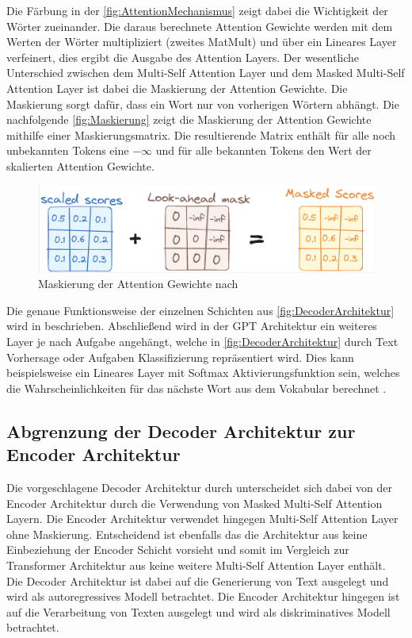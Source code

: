 \documentclass[conference]{IEEEtran}
\begin{document}
Die Färbung in der \autoref{fig:AttentionMechanismus} zeigt dabei die Wichtigkeit der Wörter zueinander. Die daraus berechnete Attention Gewichte werden mit dem Werten der Wörter multipliziert (zweites MatMult) und über ein Lineares Layer verfeinert, dies ergibt die Ausgabe des Attention Layers. 
Der wesentliche Unterschied zwischen dem Multi-Self Attention Layer und dem Masked Multi-Self Attention Layer ist dabei die Maskierung der Attention Gewichte. Die Maskierung sorgt dafür, dass ein Wort nur von vorherigen Wörtern abhängt. Die nachfolgende \autoref{fig:Maskierung} zeigt die Maskierung der Attention Gewichte mithilfe einer Maskierungsmatrix. Die resultierende Matrix enthält für alle noch unbekannten Tokens eine $-\infty$ und für alle bekannten Tokens den Wert der skalierten Attention Gewichte.

\begin{figure}[htbp]
    \centerline{\includegraphics[width=\linewidth]{Bilder/MaskierungAttentionWeights.png}}
    \caption{Maskierung der Attention Gewichte nach \cite{WieTransformatorenFunktionieren}}
\label{fig:Maskierung}
\end{figure}
Die genaue Funktionsweise der einzelnen Schichten aus \autoref{fig:DecoderArchitektur}  wird in \cite{vaswaniAttentionAllYou2023} beschrieben. Abschließend wird in der GPT Architektur ein weiteres Layer je nach Aufgabe angehängt, welche in \autoref{fig:DecoderArchitektur} durch Text Vorhersage oder Aufgaben Klassifizierung repräsentiert wird. Dies kann beispielsweise ein Lineares Layer mit Softmax Aktivierungsfunktion sein, welches die Wahrscheinlichkeiten für das nächste Wort aus dem Vokabular berechnet \cite{WieTransformatorenFunktionieren}.
\subsection{Abgrenzung der Decoder Architektur zur Encoder Architektur}
Die vorgeschlagene Decoder Architektur durch \cite{radfordImprovingLanguageUnderstanding} unterscheidet sich dabei von der Encoder Architektur durch die Verwendung von Masked Multi-Self Attention Layern. Die Encoder Architektur verwendet hingegen Multi-Self Attention Layer ohne Maskierung. Entscheidend ist ebenfalls das die Architektur aus \cite{radfordImprovingLanguageUnderstanding} keine Einbeziehung der Encoder Schicht vorsieht und somit im Vergleich zur Transformer Architektur aus \cite{vaswaniAttentionAllYou2023} keine weitere Multi-Self Attention Layer enthält. Die Decoder Architektur ist dabei auf die Generierung von Text ausgelegt und wird als autoregressives Modell betrachtet. Die Encoder Architektur hingegen ist auf die Verarbeitung von Texten ausgelegt und wird als diskriminatives Modell betrachtet.
\end{document}

